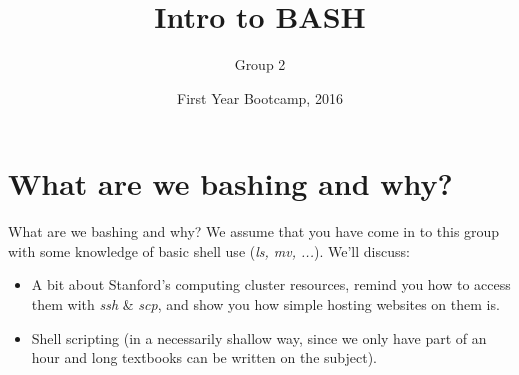 \documentclass{beamer}
\begin{document}
\title{Intro to BASH}
\subtitle{Group 2}
\author{}
\date{First Year Bootcamp, 2016}
\frame{\titlepage}

\section{What are we bashing and why?}
\begin{frame}{What are we bashing and why?}
We assume that you have come in to this group with some knowledge of basic shell use (\emph{ls, mv, ...}). We'll discuss:
\begin{itemize}
    \item<1-> A bit about Stanford's computing cluster resources, remind you how to access them with \emph{ssh} \& \emph{scp}, and show you how simple hosting websites on them is. 
    \item<2-> Shell scripting (in a necessarily shallow way, since we only have part of an hour and long textbooks can be written on the subject). 
\end{itemize}
\begin{center}
\end{center}
\end{frame}
\end{document}
